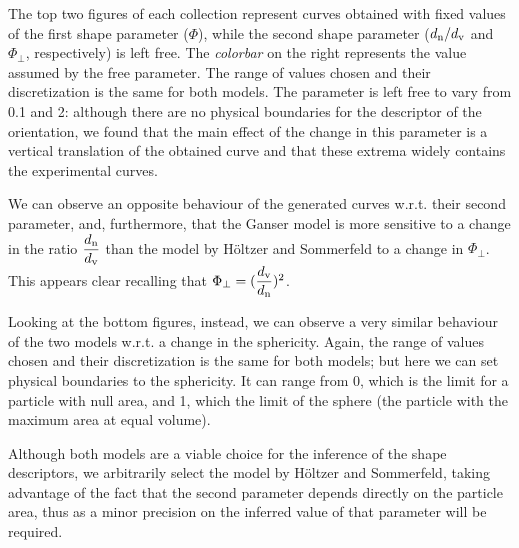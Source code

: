 		
		
		
	
	
	
		The top two figures of each collection represent curves obtained with fixed values of the first shape parameter ($ \Phi $), while the second shape parameter ($ d_{\textup{n}} / d_{\textup{v}} $ and $ \Phi_{\perp} $, respectively) is left free. The \textit{colorbar} on the right represents the value assumed by the free parameter. The range of values chosen and their discretization is the same for both models. The parameter is left free to vary from 0.1 and 2: although there are no physical boundaries for the descriptor of the orientation, we found that the main effect of the change in this parameter is a vertical translation of the obtained curve and that these extrema widely contains the experimental curves.
		
		We can observe an opposite behaviour of the generated curves w.r.t. their second parameter, and, furthermore, that the Ganser model is more sensitive to a change in the ratio $ \dfrac{d_{\textup{n}}}{d_{\textup{v}}} $ than the model by H\"oltzer and Sommerfeld to a change in $ \Phi_{\perp} $. This appears clear recalling that $ \Phi_{\perp} = (\dfrac{d_{\textup{v}}}{d_{\textup{n}}})^2 $.
		
		Looking at the bottom figures, instead, we can observe a very similar behaviour of the two models w.r.t. a change in the sphericity. Again, the range of values chosen and their discretization is the same for both models; but here we can set physical boundaries to the sphericity. It can range from 0, which is the limit for a particle with null area, and 1, which the limit of the sphere (the particle with the maximum area at equal volume).
		
		Although both models are a viable choice for the inference of the shape descriptors, we arbitrarily select the model by H\"oltzer and Sommerfeld, taking advantage of the fact that the second parameter depends directly on the particle area, thus as a minor precision on the inferred value of that parameter will be required.
		
	
	
	
	
